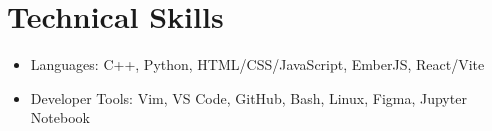 \documentclass[11pt,a4paper]{article}
\begin{document}
\section*{Technical Skills}
\begin{itemize}[leftmargin=*, topsep=0pt, itemsep=1pt, parsep=0pt]
  \item Languages: C++, Python, HTML/CSS/JavaScript, EmberJS, React/Vite  
  \item Developer Tools: Vim, VS Code, GitHub, Bash, Linux, Figma, Jupyter Notebook 
\end{itemize}

\end{document}
